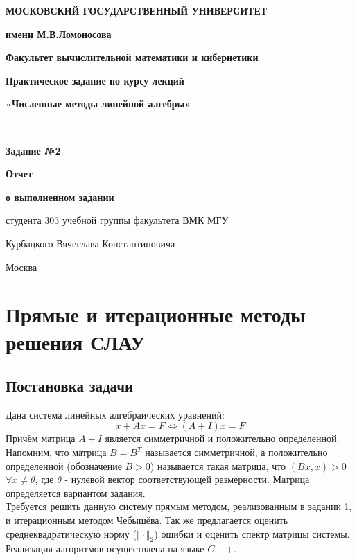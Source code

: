 \documentclass[a4paper,12pt,titlepage,final]{article}
\begin{document}
\begin{titlepage}
\centering\noindent
{
\begin{minipage}{0.1\textwidth}

\end{minipage}
\hfill
\begin{minipage}{0.77\textwidth}
\begin{center}
\textbf{МОСКОВСКИЙ ГОСУДАРСТВЕННЫЙ УНИВЕРСИТЕТ}\par
\textbf{имени М.В.Ломоносова}\par
\end{center}
\end{minipage}
\hfill
\begin{minipage}{0.1\textwidth}

\end{minipage}
}\par
{
\textbf{Факультет вычислительной математики и кибернетики}\par
\nointerlineskip
\noindent\makebox[\linewidth]{\rule{\textwidth}{0.4pt}}
}
\vfill
{
\Large{\textbf{Практическое задание по курсу лекций}}\par
\Large{\textbf{«Численные методы линейной алгебры»}}\par
}\\
{
\Large{\textbf{Задание №2}}\par
}
{
\Large{\textbf{Отчет}}\par
\Large{\textbf{о выполненном задании}}\par
\Large{студента 303 учебной группы факультета ВМК МГУ}\par
\Large{Курбацкого Вячеслава Константиновича}\par
}
\vfill
{\small Москва\\ \the\year{}}
\end{titlepage}
\tableofcontents
\newpage
\section{Прямые и итерационные методы решения СЛАУ}
\subsection{Постановка задачи}
Дана система линейных алгебраических уравнений:
$$x + Ax = F \Leftrightarrow (A + I)x = F$$
Причём матрица $A + I$ является симметричной и положительно определенной. Напомним, что матрица $B = B^T$ называется симметричной, а положительно определенной (обозначение $B > 0$) называется такая матрица, что $(Bx, x) > 0$ $\forall x \neq \theta$, где $\theta$ - нулевой вектор соответствующей размерности. Матрица определяется вариантом задания. \\
Требуется решить данную систему прямым методом, реализованным в задании 1, и итерационным методом Чебышёва. Так же предлагается оценить среднеквадратическую норму ($\Vert \cdot \Vert_2$) ошибки и оценить спектр матрицы системы. Реализация алгоритмов осуществлена на языке $C++$.
\end{document}
